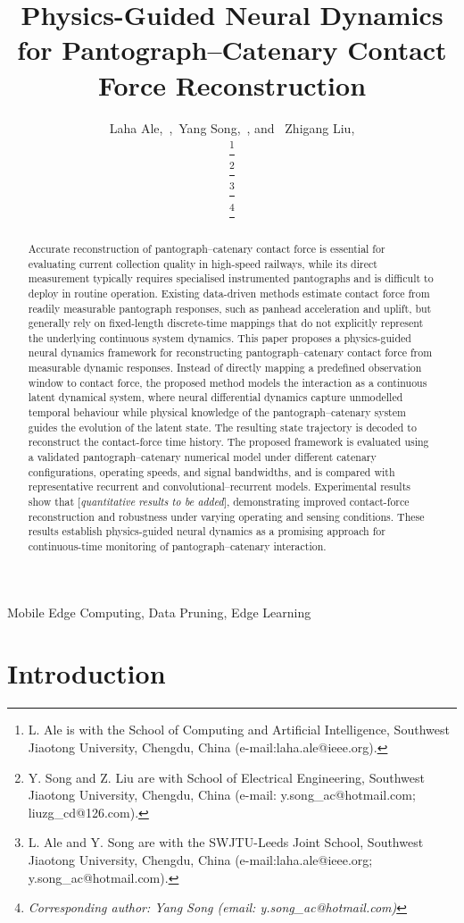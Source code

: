 \documentclass[journal,twoside]{IEEEtran}
\title{Physics-Guided Neural Dynamics for Pantograph--Catenary Contact Force Reconstruction}
\author {~Laha Ale,~\IEEEmembership{Senior~Member,~IEEE},~Yang Song,~\IEEEmembership{Senior~Member,~IEEE}, and ~Zhigang Liu,~\IEEEmembership{Life~Fellow,~IEEE}


\thanks{L. Ale is with the School of Computing and Artificial Intelligence, Southwest Jiaotong University, Chengdu, China (e-mail:laha.ale@ieee.org).}%

\thanks{Y. Song and Z. Liu are with School of Electrical Engineering, Southwest Jiaotong University, Chengdu, China (e-mail: y.song\_ac@hotmail.com; liuzg\_cd@126.com).}%

\thanks{L. Ale and Y. Song are with the SWJTU-Leeds Joint School, Southwest Jiaotong University, Chengdu, China (e-mail:laha.ale@ieee.org; y.song\_ac@hotmail.com).}


\thanks{\emph{Corresponding author: Yang Song (email: y.song\_ac@hotmail.com)}}



 
 }
\begin{document}
\maketitle

\begin{abstract}
Accurate reconstruction of pantograph--catenary contact force is essential for evaluating current collection quality in high-speed railways, while its direct measurement typically requires specialised instrumented pantographs and is difficult to deploy in routine operation. Existing data-driven methods estimate contact force from readily measurable pantograph responses, such as panhead acceleration and uplift, but generally rely on fixed-length discrete-time mappings that do not explicitly represent the underlying continuous system dynamics. This paper proposes a physics-guided neural dynamics framework for reconstructing pantograph--catenary contact force from measurable dynamic responses. Instead of directly mapping a predefined observation window to contact force, the proposed method models the interaction as a continuous latent dynamical system, where neural differential dynamics capture unmodelled temporal behaviour while physical knowledge of the pantograph--catenary system guides the evolution of the latent state. The resulting state trajectory is decoded to reconstruct the contact-force time history. The proposed framework is evaluated using a validated pantograph--catenary numerical model under different catenary configurations, operating speeds, and signal bandwidths, and is compared with representative recurrent and convolutional--recurrent models. Experimental results show that [\textit{quantitative results to be added}], demonstrating improved contact-force reconstruction and robustness under varying operating and sensing conditions. These results establish physics-guided neural dynamics as a promising approach for continuous-time monitoring of pantograph--catenary interaction.
\end{abstract}



\begin{IEEEkeywords}
Mobile Edge Computing,  Data Pruning, Edge Learning
\end{IEEEkeywords}
\IEEEpeerreviewmaketitle
\thispagestyle{plain} %
\pagestyle{plain}    %
% 
\section{Introduction}
\label{sec_intro}
\end{document}
